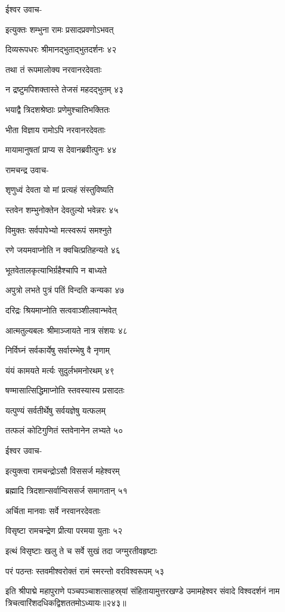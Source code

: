 ईश्वर उवाच-

इत्युक्तः शम्भुना रामः प्रसादप्रवणोऽभवत्

दिव्यरूपधरः श्रीमानद्भुताद्भुतदर्शनः ४२

तथा तं रूपमालोक्य नरवानरदेवताः

न द्रष्टुमपिशक्तास्ते तेजसं महदद्भुतम् ४३

भयाद्वै त्रिदशश्रेष्ठाः प्रणेमुश्चातिभक्तितः

भीता विज्ञाय रामोऽपि नरवानरदेवताः

मायामानुषतां प्राप्य स देवानब्रवीत्पुनः ४४

रामचन्द्र उवाच-

शृणुध्वं देवता यो मां प्रत्यहं संस्तुविष्यति

स्तवेन शम्भुनोक्तेन देवतुल्यो भवेन्नरः ४५

विमुक्तः सर्वपापेभ्यो मत्स्वरूपं समश्नुते

रणे जयमवाप्नोति न क्वचित्प्रतिहन्यते ४६

भूतवेतालकृत्याभिर्ग्रहैश्चापि न बाध्यते

अपुत्रो लभते पुत्रं पतिं विन्दति कन्यका ४७

दरिद्रः श्रियमाप्नोति सत्ववाञ्शीलवान्भवेत्

आत्मतुल्यबलः श्रीमाञ्जायते नात्र संशयः ४८

निर्विघ्नं सर्वकार्येषु सर्वारम्भेषु वै नृणाम्

यंयं कामयते मर्त्यः सुदुर्लभमनोरथम् ४९

षण्मासात्सिद्धिमाप्नोति स्तवस्यास्य प्रसादतः

यत्पुण्यं सर्वतीर्थेषु सर्वयज्ञेषु यत्फलम्

तत्फलं कोटिगुणितं स्तवेनानेन लभ्यते ५०

ईश्वर उवाच-

इत्युक्त्वा रामचन्द्रोऽसौ विससर्ज महेश्वरम्

ब्रह्मादि त्रिदशान्सर्वान्विससर्ज समागतान् ५१

अर्चिता मानवाः सर्वे नरवानरदेवताः

विसृष्टा रामचन्द्रेण प्रीत्या परमया युताः ५२

इत्थं विसृष्टाः खलु ते च सर्वे सुखं तदा जग्मुरतीवहृष्टाः

परं पठन्तः स्तवमीश्वरोक्तं रामं स्मरन्तो वरविश्वरूपम् ५३

इति श्रीपाद्मे महापुराणे पञ्चपञ्चाशत्साहस्र्यां संहितायामुत्तरखण्डे उमामहेश्वर संवादे विश्वदर्शनं नाम त्रिचत्वारिंशदधिकद्विशततमोऽध्यायः॥२४३॥


